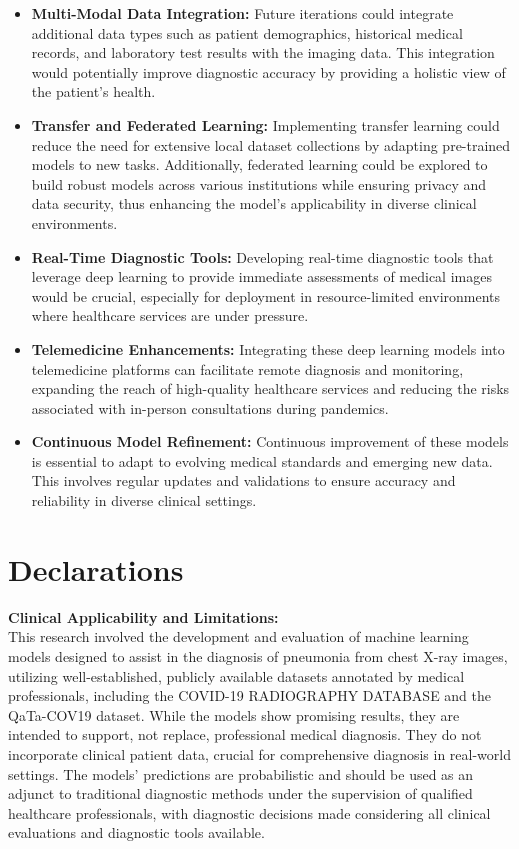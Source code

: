 \documentclass[10pt]{article}
\begin{document}
\begin{itemize}
    \item \textbf{Multi-Modal Data Integration:} Future iterations could integrate additional data types such as patient demographics, historical medical records, and laboratory test results with the imaging data. This integration would potentially improve diagnostic accuracy by providing a holistic view of the patient's health.
    
    \item \textbf{Transfer and Federated Learning:} Implementing transfer learning could reduce the need for extensive local dataset collections by adapting pre-trained models to new tasks. Additionally, federated learning could be explored to build robust models across various institutions while ensuring privacy and data security, thus enhancing the model's applicability in diverse clinical environments.
    
    \item \textbf{Real-Time Diagnostic Tools:} Developing real-time diagnostic tools that leverage deep learning to provide immediate assessments of medical images would be crucial, especially for deployment in resource-limited environments where healthcare services are under pressure.
    
    \item \textbf{Telemedicine Enhancements:} Integrating these deep learning models into telemedicine platforms can facilitate remote diagnosis and monitoring, expanding the reach of high-quality healthcare services and reducing the risks associated with in-person consultations during pandemics.
    
    \item \textbf{Continuous Model Refinement:} Continuous improvement of these models is essential to adapt to evolving medical standards and emerging new data. This involves regular updates and validations to ensure accuracy and reliability in diverse clinical settings.
\end{itemize}



\section*{Declarations}

\textbf{Clinical Applicability and Limitations:} \\
This research involved the development and evaluation of machine learning models designed to assist in the diagnosis of pneumonia from chest X-ray images, utilizing well-established, publicly available datasets annotated by medical professionals, including the COVID-19 RADIOGRAPHY DATABASE and the QaTa-COV19 dataset. While the models show promising results, they are intended to support, not replace, professional medical diagnosis. They do not incorporate clinical patient data, crucial for comprehensive diagnosis in real-world settings. The models' predictions are probabilistic and should be used as an adjunct to traditional diagnostic methods under the supervision of qualified healthcare professionals, with diagnostic decisions made considering all clinical evaluations and diagnostic tools available.


\end{document}
